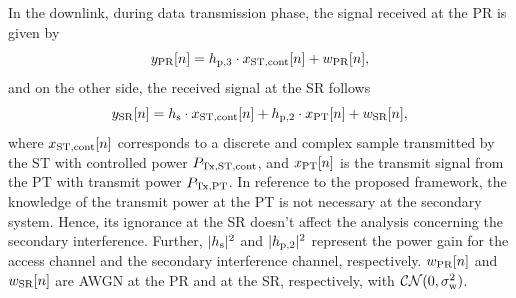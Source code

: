 In the downlink, during data transmission phase, the signal received at the PR is given by
\begin{equation}
y_{\text{PR}}[n] = h_{\text{p,3}}  \cdot x_{\text{ST,cont}}[n] + w_{\text{PR}}[n],
\label{eq_US:sys_mod_pr}
\end{equation}
and on the other side, the received signal at the SR follows 
\begin{equation}
y_{\text{SR}}[n] = h_{\text{s}} \cdot x_{\text{ST,cont}}[n] + h_{\text{p,2}} \cdot x_{\text{PT}}[n] + w_{\text{SR}}[n],
\label{eq_US:sys_mod_sr}
\end{equation}
where $x_{\text{ST,cont}}[n]$ corresponds to a discrete and complex sample transmitted by the ST with controlled power $P_{\text{Tx,ST,cont}}$, and $x_{\text{PT}}[n]$ is the transmit signal from the PT with transmit power $P_{\text{Tx,PT}}$. In reference to the proposed framework, the knowledge of the transmit power at the PT is not necessary at the secondary system. Hence, its ignorance at the SR doesn't affect the analysis concerning the secondary interference. Further, $|h_{\text{s}}|^2$ and $|h_{\text{p,2}}|^2$ represent the power gain for the access channel and the secondary interference channel, respectively. $w_{\text{PR}}[n]$ and $w_{\text{SR}}[n]$ are AWGN at the PR and at the SR, respectively, with $\mathcal{CN}(0, \sigma^2_{\text{w}})$.%


